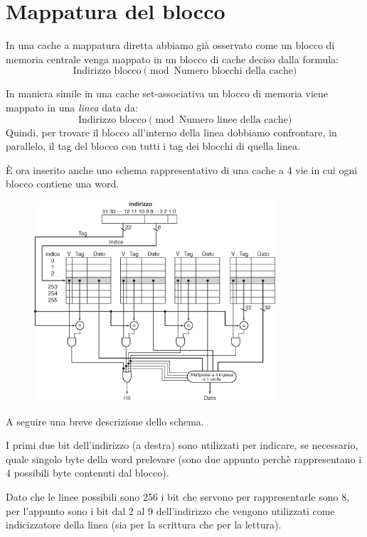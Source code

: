 \documentclass[class=book, crop=false, oneside]{standalone}
\begin{document}
\section{Mappatura del blocco}
In una cache a mappatura diretta abbiamo già osservato come un blocco di memoria centrale venga mappato in un blocco di cache deciso dalla formula:
\begin{equation*}
	\textrm{Indirizzo blocco} \pmod{\textrm{Numero blocchi della cache}}
\end{equation*}

In maniera simile in una cache set-associativa un blocco di memoria viene mappato in una \emph{linea} data da:
\begin{equation*}
	\textrm{Indirizzo blocco} \pmod{\textrm{Numero linee della cache}}
\end{equation*}
Quindi, per trovare il blocco all’interno della linea dobbiamo confrontare, in parallelo, il tag del blocco con tutti i tag dei blocchi di quella linea.

È ora inserito anche uno schema rappresentativo di una cache a 4 vie in cui ogni blocco contiene una word.

\begin{figure}[H]
	\centering
	\includegraphics[width=0.8\textwidth,keepaspectratio]{4-vie}
\end{figure}
A seguire una breve descrizione dello schema.

I primi due bit dell'indirizzo (a destra) sono utilizzati per indicare, se necessario, quale singolo byte della word prelevare (sono due appunto perchè rappresentano i 4 possibili byte contenuti dal blocco).

Dato che le linee possibili sono 256 i bit che servono per rappresentarle sono 8, per l'appunto sono i bit dal 2 al 9 dell'indirizzo che vengono utilizzati come indicizzatore della linea (sia per la scrittura che per la lettura).
\end{document}

